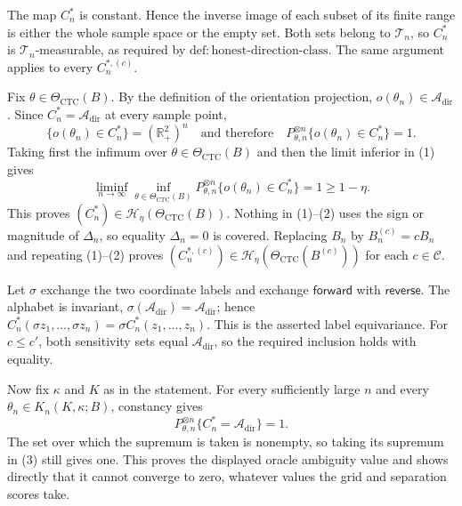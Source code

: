 The map \(C_n^*\) is constant.  Hence the inverse image of each subset of its finite range is either the whole sample space or the empty set.  Both sets belong to \(\mathcal T_n\), so \(C_n^*\) is \(\mathcal T_n\)-measurable, as required by \(\mathrm{def{:}honest\text{-}direction\text{-}class}\).  The same argument applies to every \(C_n^{*,(c)}\).

Fix \(\theta\in\Theta_{\mathrm{CTC}}(B)\).  By the definition of the orientation projection, \(o(\theta_n)\in\mathcal A_{\mathrm{dir}}\).  Since \(C_n^*=\mathcal A_{\mathrm{dir}}\) at every sample point,
\[
 \{o(\theta_n)\in C_n^*\}=(\mathbb R_+^2)^n
 \quad\text{and therefore}\quad
 P_{\theta,n}^{\otimes n}\{o(\theta_n)\in C_n^*\}=1. \tag{1}
\]
Taking first the infimum over \(\theta\in\Theta_{\mathrm{CTC}}(B)\) and then the limit inferior in (1) gives
\[
 \liminf_{n\to\infty}\inf_{\theta\in\Theta_{\mathrm{CTC}}(B)}
 P_{\theta,n}^{\otimes n}\{o(\theta_n)\in C_n^*\}
 =1\geq1-\eta. \tag{2}
\]
This proves \((C_n^*)\in\mathcal H_\eta(\Theta_{\mathrm{CTC}}(B))\).  Nothing in (1)--(2) uses the sign or magnitude of \(\Delta_n\), so equality \(\Delta_n=0\) is covered.  Replacing \(B_n\) by \(B_n^{(c)}=cB_n\) and repeating (1)--(2) proves \((C_n^{*,(c)})\in\mathcal H_\eta(\Theta_{\mathrm{CTC}}(B^{(c)}))\) for each \(c\in\mathcal C\).

Let \(\sigma\) exchange the two coordinate labels and exchange \(\mathsf{forward}\) with \(\mathsf{reverse}\).  The alphabet is invariant, \(\sigma(\mathcal A_{\mathrm{dir}})=\mathcal A_{\mathrm{dir}}\); hence \(C_n^*(\sigma z_1,\ldots,\sigma z_n)=\sigma C_n^*(z_1,\ldots,z_n)\).  This is the asserted label equivariance.  For \(c\leq c'\), both sensitivity sets equal \(\mathcal A_{\mathrm{dir}}\), so the required inclusion holds with equality.

Now fix \(\kappa\) and \(K\) as in the statement.  For every sufficiently large \(n\) and every \(\theta_n\in K_n(K,\kappa;B)\), constancy gives
\[
 P_{\theta,n}^{\otimes n}\{C_n^*=\mathcal A_{\mathrm{dir}}\}=1. \tag{3}
\]
The set over which the supremum is taken is nonempty, so taking its supremum in (3) still gives one.  This proves the displayed oracle ambiguity value and shows directly that it cannot converge to zero, whatever values the grid and separation scores take.

